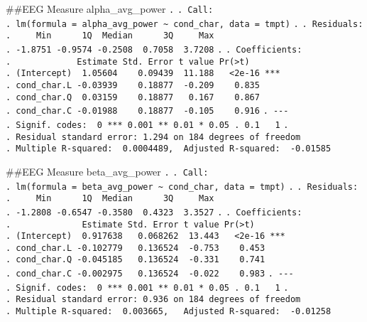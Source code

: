 \documentclass[
]{article}
\begin{document}
\#\#EEG Measure alpha\_avg\_power \texttt{.} \texttt{.\ Call:}
\texttt{.\ lm(formula\ =\ alpha\_avg\_power\ \textasciitilde{}\ cond\_char,\ data\ =\ tmpt)}
\texttt{.} \texttt{.\ Residuals:}
\texttt{.\ \ \ \ \ Min\ \ \ \ \ \ 1Q\ \ Median\ \ \ \ \ \ 3Q\ \ \ \ \ Max}
\texttt{.\ -1.8751\ -0.9574\ -0.2508\ \ 0.7058\ \ 3.7208} \texttt{.}
\texttt{.\ Coefficients:}
\texttt{.\ \ \ \ \ \ \ \ \ \ \ \ \ Estimate\ Std.\ Error\ t\ value\ Pr(\textgreater{}\textbar{}t\textbar{})}
\texttt{.\ (Intercept)\ \ 1.05604\ \ \ \ 0.09439\ \ 11.188\ \ \ \textless{}2e-16\ ***}
\texttt{.\ cond\_char.L\ -0.03939\ \ \ \ 0.18877\ \ -0.209\ \ \ \ 0.835}
\texttt{.\ cond\_char.Q\ \ 0.03159\ \ \ \ 0.18877\ \ \ 0.167\ \ \ \ 0.867}
\texttt{.\ cond\_char.C\ -0.01988\ \ \ \ 0.18877\ \ -0.105\ \ \ \ 0.916}
\texttt{.\ -\/-\/-}
\texttt{.\ Signif.\ codes:\ \ 0\ \textquotesingle{}***\textquotesingle{}\ 0.001\ \textquotesingle{}**\textquotesingle{}\ 0.01\ \textquotesingle{}*\textquotesingle{}\ 0.05\ \textquotesingle{}.\textquotesingle{}\ 0.1\ \textquotesingle{}\ \textquotesingle{}\ 1}
\texttt{.}
\texttt{.\ Residual\ standard\ error:\ 1.294\ on\ 184\ degrees\ of\ freedom}
\texttt{.\ Multiple\ R-squared:\ \ 0.0004489,\ \ Adjusted\ R-squared:\ \ -0.01585}

\#\#EEG Measure beta\_avg\_power \texttt{.} \texttt{.\ Call:}
\texttt{.\ lm(formula\ =\ beta\_avg\_power\ \textasciitilde{}\ cond\_char,\ data\ =\ tmpt)}
\texttt{.} \texttt{.\ Residuals:}
\texttt{.\ \ \ \ \ Min\ \ \ \ \ \ 1Q\ \ Median\ \ \ \ \ \ 3Q\ \ \ \ \ Max}
\texttt{.\ -1.2808\ -0.6547\ -0.3580\ \ 0.4323\ \ 3.3527} \texttt{.}
\texttt{.\ Coefficients:}
\texttt{.\ \ \ \ \ \ \ \ \ \ \ \ \ \ Estimate\ Std.\ Error\ t\ value\ Pr(\textgreater{}\textbar{}t\textbar{})}
\texttt{.\ (Intercept)\ \ 0.917638\ \ \ 0.068262\ \ 13.443\ \ \ \textless{}2e-16\ ***}
\texttt{.\ cond\_char.L\ -0.102779\ \ \ 0.136524\ \ -0.753\ \ \ \ 0.453}
\texttt{.\ cond\_char.Q\ -0.045185\ \ \ 0.136524\ \ -0.331\ \ \ \ 0.741}
\texttt{.\ cond\_char.C\ -0.002975\ \ \ 0.136524\ \ -0.022\ \ \ \ 0.983}
\texttt{.\ -\/-\/-}
\texttt{.\ Signif.\ codes:\ \ 0\ \textquotesingle{}***\textquotesingle{}\ 0.001\ \textquotesingle{}**\textquotesingle{}\ 0.01\ \textquotesingle{}*\textquotesingle{}\ 0.05\ \textquotesingle{}.\textquotesingle{}\ 0.1\ \textquotesingle{}\ \textquotesingle{}\ 1}
\texttt{.}
\texttt{.\ Residual\ standard\ error:\ 0.936\ on\ 184\ degrees\ of\ freedom}
\texttt{.\ Multiple\ R-squared:\ \ 0.003665,\ \ \ Adjusted\ R-squared:\ \ -0.01258}
\end{document}
